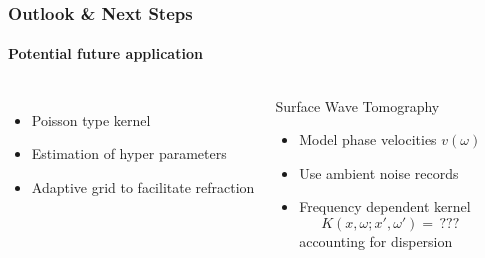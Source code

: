 \documentclass[aspectratio=169, t, 10pt,
    ignorenonframetext,
    ]{beamer}
\begin{document}
\begin{frame}
    \frametitle{Outlook \& Next Steps }
    \framesubtitle{Potential future application}

\begin{columns}
%

    \begin{itemize}
        \item Poisson type kernel
        \item Estimation of hyper parameters
        \item Adaptive grid to facilitate refraction
    \end{itemize}

    \begin{block}{Surface Wave Tomography}
        \begin{itemize}
            \item Model phase velocities $v(\omega)$
            \item Use ambient noise records
            \item Frequency dependent kernel
                \begin{equation}
                    K(x,\omega; x', \omega') = \, ???
                \end{equation}
                accounting for dispersion
        \end{itemize}
    \end{block}


\end{columns}
\end{frame}
\end{document}

